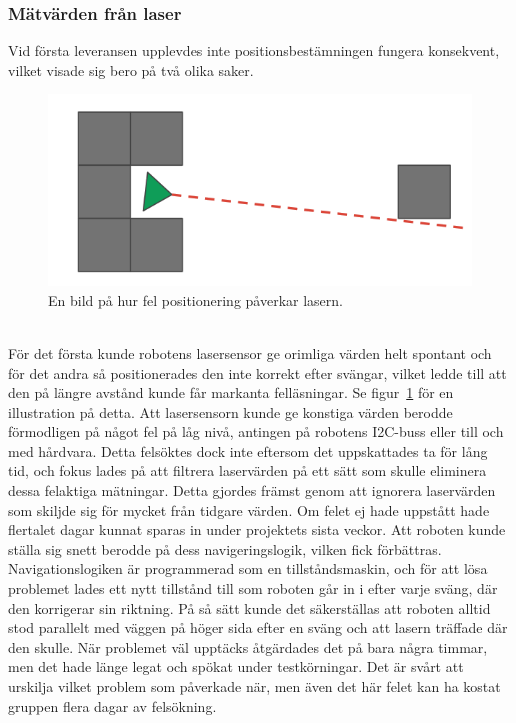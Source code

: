 \documentclass{article}
\begin{document}
\subsubsection{Mätvärden från laser}
Vid första leveransen upplevdes inte positionsbestämningen fungera konsekvent, vilket visade sig bero på två olika saker. 
\begin{figure}[H]
\centering
\includegraphics[scale=0.5]{wrongly_positioned_laser}
\caption{En bild på hur fel positionering påverkar lasern.}
\label{fig:wrongly_positioned_laser}
\end{figure}
\ \\
För det första kunde robotens lasersensor ge orimliga värden helt spontant och för det andra så positionerades den inte korrekt efter svängar, vilket ledde till att den på längre avstånd kunde får markanta felläsningar. Se figur~\ref{fig:wrongly_positioned_laser} för en illustration på detta.
\newline\newline
Att lasersensorn kunde ge konstiga värden berodde förmodligen på något fel på låg nivå, antingen på robotens I2C-buss eller till och med hårdvara. Detta felsöktes dock inte eftersom det uppskattades ta för lång tid, och fokus lades på att filtrera laservärden på ett sätt som skulle eliminera dessa felaktiga mätningar. Detta gjordes främst genom att ignorera laservärden som skiljde sig för mycket från tidgare värden. Om felet ej hade uppstått hade flertalet dagar kunnat sparas in under projektets sista veckor.
\newline\newline
Att roboten kunde ställa sig snett berodde på dess navigeringslogik, vilken fick förbättras. Navigationslogiken är programmerad som en tillståndsmaskin, och för att lösa problemet lades ett nytt tillstånd till som roboten går in i efter varje sväng, där den korrigerar sin riktning. På så sätt kunde det säkerställas att roboten alltid stod parallelt med väggen på höger sida efter en sväng och att lasern träffade där den skulle. När problemet väl upptäcks åtgärdades det på bara några timmar, men det hade länge legat och spökat under testkörningar. Det är svårt att urskilja vilket problem som påverkade när, men även det här felet kan ha kostat gruppen flera dagar av felsökning.
\end{document}
